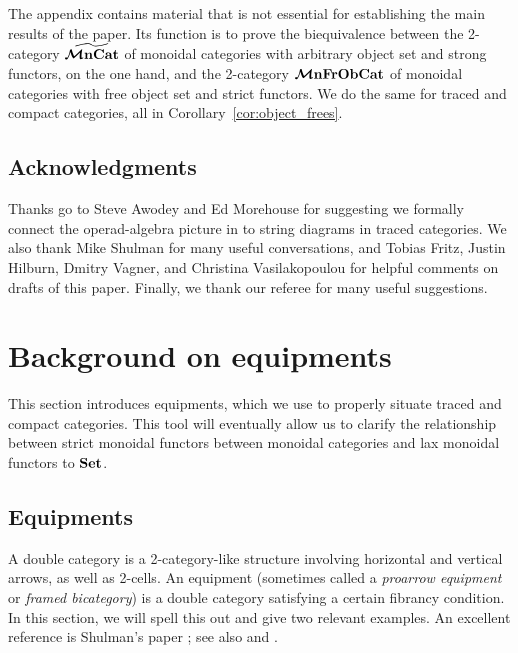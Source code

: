 \documentclass[11pt,oneside,article]{memoir}
\begin{document}
The appendix contains material that is not essential for establishing the main results of the paper. Its function is to prove the
biequivalence between the 2-category $\widetilde{\bm{\mathcal{M}}\mathbf{nCat}}$ of monoidal categories with arbitrary object
set and strong functors, on the one hand, and the 2-category $\bm{\mathcal{M}}\mathbf{nFrObCat}$ of monoidal categories
with free object set and strict functors. We do the same for traced and compact categories, all in
Corollary~\ref{cor:object_frees}.

\section*{Acknowledgments}

Thanks go to Steve Awodey and Ed Morehouse for suggesting we formally connect the operad-algebra
picture in \cite{RupelSpivak} to string diagrams in traced categories. We also thank Mike Shulman
for many useful conversations, and Tobias Fritz, Justin Hilburn, Dmitry Vagner, and Christina Vasilakopoulou for helpful comments on drafts of this paper. Finally, we thank our referee for many useful suggestions.

\chapter{Background on equipments}
      \label{chap:background_equipments}

This section introduces equipments, which we use to properly situate traced and compact categories.
This tool will eventually allow us to clarify the relationship between strict monoidal functors
between monoidal categories and lax monoidal functors to $\mathbf{Set}$.

\section{Equipments}
   \label{sec:equipments}

A double category is a 2-category-like structure involving horizontal and vertical arrows, as well
as 2-cells. An equipment (sometimes called a \emph{proarrow equipment} or \emph{framed bicategory})
is a double category satisfying a certain fibrancy condition. In this section, we will spell this
out and give two relevant examples. An excellent reference is Shulman's paper \cite{Shulman}; see also
\cite{Wood1} and \cite{Wood2}.
\end{document}

